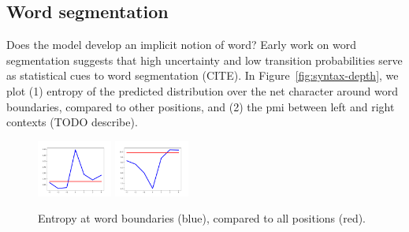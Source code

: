 \subsection{Word segmentation}
\label{sec:segmentation}



Does the model develop an implicit notion of word?
Early work on word segmentation suggests that high uncertainty and low transition probabilities serve as statistical cues to word segmentation (CITE).
In Figure~\ref{fig:syntax-depth}, we plot (1) entropy of the predicted distribution over the net character around word boundaries, compared to other positions, and (2) the pmi between left and right contexts (TODO describe).



\begin{figure}
\includegraphics[width=0.22\textwidth]{figures/segmentation-profile-flattened-entropies-german.png}
\includegraphics[width=0.22\textwidth]{figures/segmentation-profile-flattened-pmis-german.png}
	\caption{Entropy at word boundaries (blue), compared to all positions (red). }\label{fig:boundaries-entropy}
\end{figure}



%
%
%


